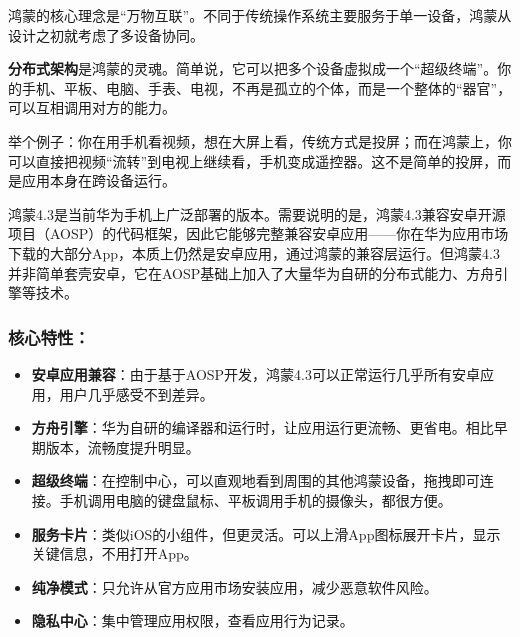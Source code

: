 


鸿蒙的核心理念是“万物互联”。不同于传统操作系统主要服务于单一设备，鸿蒙从设计之初就考虑了多设备协同。

\textbf{分布式架构}是鸿蒙的灵魂。简单说，它可以把多个设备虚拟成一个“超级终端”。你的手机、平板、电脑、手表、电视，不再是孤立的个体，而是一个整体的“器官”，可以互相调用对方的能力。

举个例子：你在用手机看视频，想在大屏上看，传统方式是投屏；而在鸿蒙上，你可以直接把视频“流转”到电视上继续看，手机变成遥控器。这不是简单的投屏，而是应用本身在跨设备运行。


鸿蒙4.3是当前华为手机上广泛部署的版本。需要说明的是，鸿蒙4.3兼容安卓开源项目（AOSP）的代码框架，因此它能够完整兼容安卓应用——你在华为应用市场下载的大部分App，本质上仍然是安卓应用，通过鸿蒙的兼容层运行。但鸿蒙4.3并非简单套壳安卓，它在AOSP基础上加入了大量华为自研的分布式能力、方舟引擎等技术。

\subsubsection*{核心特性：}

\begin{itemize}
  \item \textbf{安卓应用兼容}：由于基于AOSP开发，鸿蒙4.3可以正常运行几乎所有安卓应用，用户几乎感受不到差异。
  \item \textbf{方舟引擎}：华为自研的编译器和运行时，让应用运行更流畅、更省电。相比早期版本，流畅度提升明显。
  \item \textbf{超级终端}：在控制中心，可以直观地看到周围的其他鸿蒙设备，拖拽即可连接。手机调用电脑的键盘鼠标、平板调用手机的摄像头，都很方便。
  \item \textbf{服务卡片}：类似iOS的小组件，但更灵活。可以上滑App图标展开卡片，显示关键信息，不用打开App。
  \item \textbf{纯净模式}：只允许从官方应用市场安装应用，减少恶意软件风险。
  \item \textbf{隐私中心}：集中管理应用权限，查看应用行为记录。
\end{itemize}

